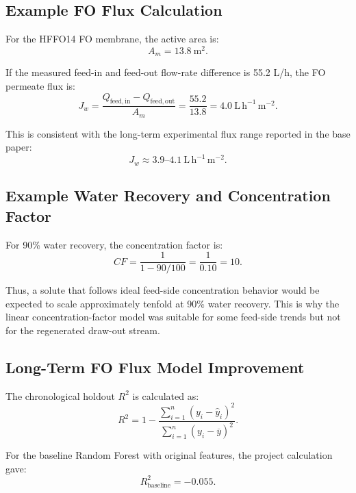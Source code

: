 \subsection{Example FO Flux Calculation}
For the HFFO14 FO membrane, the active area is:
\begin{equation}
A_m = 13.8 \ \mathrm{m^2}.
\end{equation}

If the measured feed-in and feed-out flow-rate difference is 55.2 L/h, the FO permeate flux is:
\begin{equation}
J_w =
\frac{Q_{\mathrm{feed,in}}-Q_{\mathrm{feed,out}}}{A_m}
=
\frac{55.2}{13.8}
=
4.0 \ \mathrm{L\,h^{-1}\,m^{-2}}.
\end{equation}

This is consistent with the long-term experimental flux range reported in the base paper:
\begin{equation}
J_w \approx 3.9\text{--}4.1 \ \mathrm{L\,h^{-1}\,m^{-2}}.
\end{equation}

\subsection{Example Water Recovery and Concentration Factor}
For 90\% water recovery, the concentration factor is:
\begin{equation}
CF =
\frac{1}{1-90/100}
=
\frac{1}{0.10}
=
10.
\end{equation}

Thus, a solute that follows ideal feed-side concentration behavior would be expected to scale approximately tenfold at 90\% water recovery. This is why the linear concentration-factor model was suitable for some feed-side trends but not for the regenerated draw-out stream.

\subsection{Long-Term FO Flux Model Improvement}
The chronological holdout $R^2$ is calculated as:
\begin{equation}
R^2 =
1-\frac{\sum_{i=1}^{n}(y_i-\hat{y}_i)^2}
{\sum_{i=1}^{n}(y_i-\overline{y})^2}.
\end{equation}

For the baseline Random Forest with original features, the project calculation gave:
\begin{equation}
R^2_{\mathrm{baseline}} = -0.055.
\end{equation}

